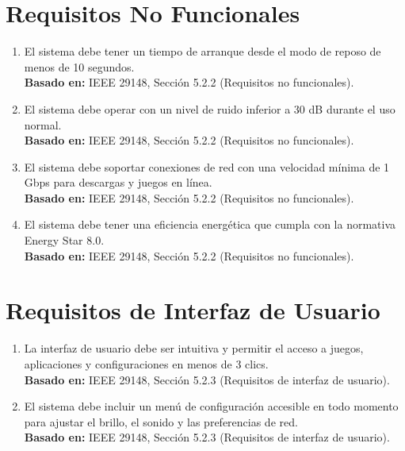 \documentclass{article}
\begin{document}
\section{Requisitos No Funcionales}
\begin{enumerate}[label=RNF-\arabic*]
    \item El sistema debe tener un tiempo de arranque desde el modo de reposo de menos de 10 segundos. \\
    \textbf{Basado en:} IEEE 29148, Sección 5.2.2 (Requisitos no funcionales).
    
    \item El sistema debe operar con un nivel de ruido inferior a 30 dB durante el uso normal. \\
    \textbf{Basado en:} IEEE 29148, Sección 5.2.2 (Requisitos no funcionales).
    
    \item El sistema debe soportar conexiones de red con una velocidad mínima de 1 Gbps para descargas y juegos en línea. \\
    \textbf{Basado en:} IEEE 29148, Sección 5.2.2 (Requisitos no funcionales).
    
    \item El sistema debe tener una eficiencia energética que cumpla con la normativa Energy Star 8.0. \\
    \textbf{Basado en:} IEEE 29148, Sección 5.2.2 (Requisitos no funcionales).
\end{enumerate}

\section{Requisitos de Interfaz de Usuario}
\begin{enumerate}[label=RI-\arabic*]
    \item La interfaz de usuario debe ser intuitiva y permitir el acceso a juegos, aplicaciones y configuraciones en menos de 3 clics. \\
    \textbf{Basado en:} IEEE 29148, Sección 5.2.3 (Requisitos de interfaz de usuario).
    
    \item El sistema debe incluir un menú de configuración accesible en todo momento para ajustar el brillo, el sonido y las preferencias de red. \\
    \textbf{Basado en:} IEEE 29148, Sección 5.2.3 (Requisitos de interfaz de usuario).
\end{enumerate}
\end{document}
